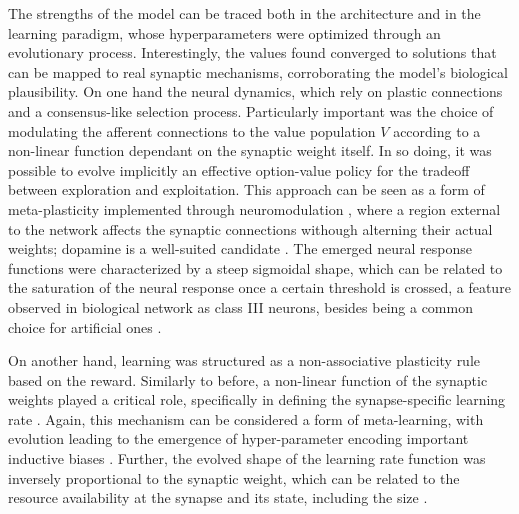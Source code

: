 The strengths of the model can be traced both in the architecture and in the learning paradigm, whose hyperparameters were optimized through an evolutionary process. Interestingly, the values found converged to solutions that can be mapped to real synaptic mechanisms, corroborating the model's biological plausibility.
On one hand the neural dynamics, which rely on plastic connections and a consensus-like selection process.
Particularly important was the choice of modulating the afferent connections to the value population $V$ according to a non-linear function dependant on the synaptic weight itself. In so doing, it was possible to evolve implicitly an effective option-value policy for the tradeoff between exploration and exploitation.
This approach can be seen as a form of meta-plasticity implemented through neuromodulation \cite{wangMetalearningNaturalArtificial2021}, where a region external to the network affects the synaptic connections withough alterning their actual weights; dopamine is a well-suited candidate \cite{toblerAdaptiveCodingReward2005, roeschDopamineNeuronsEncode2007, coolsChemistryAdaptiveMind2019}.
The emerged neural response functions were characterized by a steep sigmoidal shape, which can be related to the saturation of the neural response once a certain threshold is crossed, a feature observed in biological network as class III neurons, besides being a common choice for artificial ones \cite{ratteImpactNeuronalProperties2013, ockerFlexibleNeuralConnectivity2020, apicellaSurveyModernTrainable2021}.

On another hand, learning was structured as a non-associative plasticity rule based on the reward. Similarly to before, a non-linear function of the synaptic weights played a critical role, specifically in defining the synapse-specific learning rate \cite{larsenSynapsetypespecificPlasticityLocal2015}.
Again, this mechanism can be considered a form of meta-learning, with evolution leading to the emergence of hyper-parameter encoding important inductive biases \cite{inglisModulationDopamineAdaptive2021, iigayaAdaptiveLearningDecisionmaking2016}. Further, the evolved shape of the learning rate
function was inversely proportional to the synaptic weight, which can be related to the resource availability at the synapse and its state, including the size \cite{blackmanTargetcellspecificShorttermPlasticity2013, bartolHippocampalSpineHead2015, arielIntrinsicVariabilityPv2012}.


